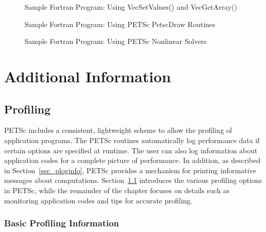 \begin{figure}[H]
{\small
{}
}
\caption{Sample Fortran Program:  Using VecSetValues() and VecGetArray()}
\label{fig_vec2-Fortran}
\end{figure}

\begin{figure}[H]
{\small
{}
}
\caption{Sample Fortran Program:  Using PETSc PetscDraw Routines}
\label{fig_draw-Fortran}
\end{figure}

\begin{figure}[H]
{\small
{}
}
\caption{Sample Fortran Program:  Using PETSc Nonlinear Solvers}
\label{fig_SNES-Fortran}
\end{figure}

\part{Additional Information}
\label{part_usefulstuff}

\chapter{Profiling} 
\label{ch_profiling} 

PETSc includes a consistent, lightweight scheme to allow the profiling
of application programs.  The PETSc routines automatically log
performance data if certain options are specified at runtime.  The
user can also log information about application codes for a complete
picture of performance.  In addition, as described in
Section~\ref{sec_ploginfo}, PETSc provides a mechanism for printing
informative messages about computations.  Section~\ref{sec_profbasic}
introduces the various profiling options in PETSc, while the
remainder of the chapter focuses on details such as monitoring
application codes and tips for accurate profiling.  

\section{Basic Profiling Information}
\label{sec_profbasic}
   

